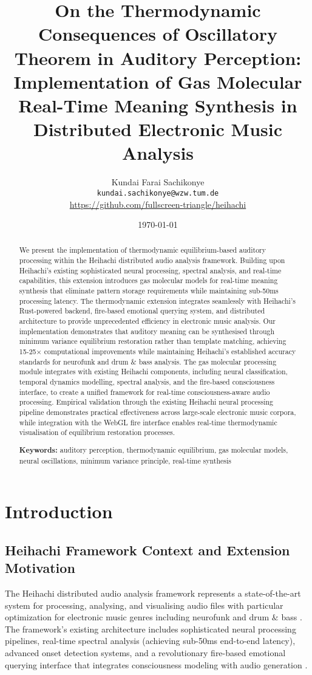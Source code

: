 \documentclass[12pt,a4paper]{article}
\title{On the Thermodynamic Consequences of Oscillatory Theorem in Auditory Perception: Implementation of Gas Molecular Real-Time Meaning Synthesis in Distributed Electronic Music Analysis}
\author{
Kundai Farai Sachikonye\\
\texttt{kundai.sachikonye@wzw.tum.de}\\
\url{https://github.com/fullscreen-triangle/heihachi}
}
\date{\today}
\begin{document}
\maketitle

\begin{abstract}
We present the implementation of thermodynamic equilibrium-based auditory processing within the Heihachi distributed audio analysis framework. Building upon Heihachi's existing sophisticated neural processing, spectral analysis, and real-time capabilities, this extension introduces gas molecular models for real-time meaning synthesis that eliminate pattern storage requirements while maintaining sub-50ms processing latency. The thermodynamic extension integrates seamlessly with Heihachi's Rust-powered backend, fire-based emotional querying system, and distributed architecture to provide unprecedented efficiency in electronic music analysis. Our implementation demonstrates that auditory meaning can be synthesised through minimum variance equilibrium restoration rather than template matching, achieving 15-25× computational improvements while maintaining Heihachi's established accuracy standards for neurofunk and drum $\&$ bass analysis. The gas molecular processing module integrates with existing Heihachi components, including neural classification, temporal dynamics modelling, spectral analysis, and the fire-based consciousness interface, to create a unified framework for real-time consciousness-aware audio processing. Empirical validation through the existing Heihachi neural processing pipeline demonstrates practical effectiveness across large-scale electronic music corpora, while integration with the WebGL fire interface enables real-time thermodynamic visualisation of equilibrium restoration processes.

\textbf{Keywords:} auditory perception, thermodynamic equilibrium, gas molecular models, neural oscillations, minimum variance principle, real-time synthesis
\end{abstract}

\section{Introduction}

\subsection{Heihachi Framework Context and Extension Motivation}

The Heihachi distributed audio analysis framework represents a state-of-the-art system for processing, analysing, and visualising audio files with particular optimization for electronic music genres including neurofunk and drum $\&$ bass \citep{heihachi2024framework}. The framework's existing architecture includes sophisticated neural processing pipelines, real-time spectral analysis (achieving sub-50ms end-to-end latency), advanced onset detection systems, and a revolutionary fire-based emotional querying interface that integrates consciousness modeling with audio generation \citep{heihachi2024fire}.
\end{document}
